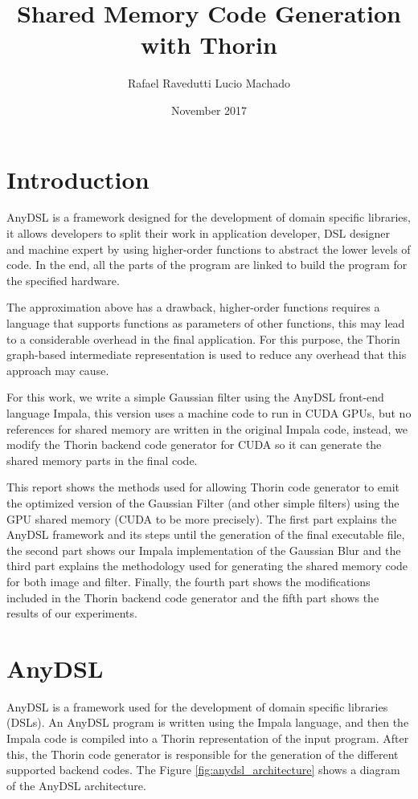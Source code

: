 \documentclass{article}
\title{Shared Memory Code Generation with Thorin}
\author{Rafael Ravedutti Lucio Machado }
\date{November 2017}
\begin{document}
\maketitle

\clearpage

\tableofcontents

\clearpage

\section{Introduction}
AnyDSL \cite{anydsl} is a framework designed for the development of domain specific libraries, it allows developers to split their work in application developer, DSL designer and machine expert by using higher-order functions to abstract the lower levels of code. In the end, all the parts of the program are linked to build the program for the specified hardware.

The approximation above has a drawback, higher-order functions requires a language that supports functions as parameters of other functions, this may lead to a considerable overhead in the final application. For this purpose, the Thorin graph-based intermediate representation is used to reduce any overhead that this approach may cause.

For this work, we write a simple Gaussian filter using the AnyDSL front-end language Impala, this version uses a machine code to run in CUDA GPUs, but no references for shared memory are written in the original Impala code, instead, we modify the Thorin backend code generator for CUDA so it can generate the shared memory parts in the final code.

This report shows the methods used for allowing Thorin code generator to emit the optimized version of the Gaussian Filter (and other simple filters) using the GPU shared memory (CUDA to be more precisely). The first part explains the AnyDSL framework and its steps until the generation of the final executable file, the second part shows our Impala implementation of the Gaussian Blur and the third part explains the methodology used for generating the shared memory code for both image and filter. Finally, the fourth part shows the modifications included in the Thorin backend code generator and the fifth part shows the results of our experiments.

\section{AnyDSL}
AnyDSL \cite{anydsl} is a framework used for the development of domain specific libraries (DSLs). An AnyDSL program is written using the Impala language, and then the Impala code is compiled into a Thorin representation of the input program. After this, the Thorin code generator is responsible for the generation of the different supported backend codes. The Figure \ref{fig:anydsl_architecture} shows a diagram of the AnyDSL architecture.
\end{document}
